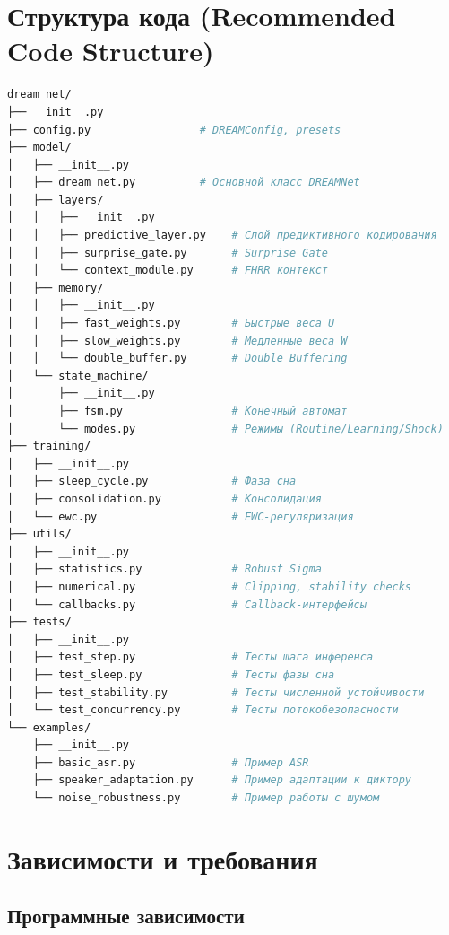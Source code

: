 \section{Структура кода (Recommended Code Structure)}

\begin{lstlisting}[language=bash, caption={Рекомендуемая структура проекта}, label={lst:project_structure}]
dream_net/
├── __init__.py
├── config.py                 # DREAMConfig, presets
├── model/
│   ├── __init__.py
│   ├── dream_net.py          # Основной класс DREAMNet
│   ├── layers/
│   │   ├── __init__.py
│   │   ├── predictive_layer.py    # Слой предиктивного кодирования
│   │   ├── surprise_gate.py       # Surprise Gate
│   │   └── context_module.py      # FHRR контекст
│   ├── memory/
│   │   ├── __init__.py
│   │   ├── fast_weights.py        # Быстрые веса U
│   │   ├── slow_weights.py        # Медленные веса W
│   │   └── double_buffer.py       # Double Buffering
│   └── state_machine/
│       ├── __init__.py
│       ├── fsm.py                 # Конечный автомат
│       └── modes.py               # Режимы (Routine/Learning/Shock)
├── training/
│   ├── __init__.py
│   ├── sleep_cycle.py             # Фаза сна
│   ├── consolidation.py           # Консолидация
│   └── ewc.py                     # EWC-регуляризация
├── utils/
│   ├── __init__.py
│   ├── statistics.py              # Robust Sigma
│   ├── numerical.py               # Clipping, stability checks
│   └── callbacks.py               # Callback-интерфейсы
├── tests/
│   ├── __init__.py
│   ├── test_step.py               # Тесты шага инференса
│   ├── test_sleep.py              # Тесты фазы сна
│   ├── test_stability.py          # Тесты численной устойчивости
│   └── test_concurrency.py        # Тесты потокобезопасности
└── examples/
    ├── __init__.py
    ├── basic_asr.py               # Пример ASR
    ├── speaker_adaptation.py      # Пример адаптации к диктору
    └── noise_robustness.py        # Пример работы с шумом
\end{lstlisting}

\section{Зависимости и требования}

\subsection{Программные зависимости}

